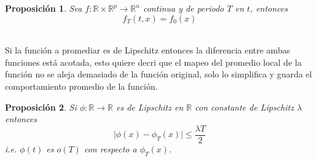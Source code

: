 \documentclass[12pt, a4paper]{report}
\providecommand{\abs}[1]{\lvert#1\rvert}
\newtheorem{proposition}{Proposición}
\begin{document}
\begin{proposition}
	Sea $f:\mathbb{R}\times\mathbb{R}^p\to\mathbb{R}^n$ continua y de periodo $T$ en $t$, entonces
	$$
		f_T(t,x)=f_0(x)
	$$
\end{proposition}
\\
Si la función a promediar es de Lipschitz entonces la diferencia entre ambas
funciones está acotada, esto quiere decri que el mapeo del promedio local de 
la función no se aleja demasiado de la función original, solo lo simplifica 
y guarda el comportamiento promedio de la función.
\begin{proposition}
	Si $\phi:\mathbb{R}\to\mathbb{R}$ es de Lipschitz en $\mathbb{R}$ con constante de Lipschitz $\lambda$ entonces
	$$
		\abs{\phi(x)-\phi_T(x)}\leq\frac{\lambda T}{2}
	$$
	i.e. $\phi(t)$ es $o(T)$ con respecto a $\phi_T(x)$.
\end{proposition}
\\
\end{document}
